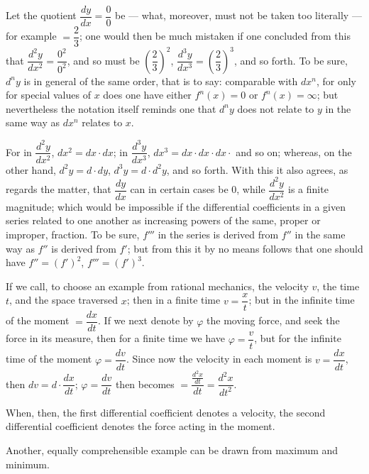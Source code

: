 \documentclass[12pt]{book}
\begin{document}
Let the quotient $\dfrac{dy}{dx} = \dfrac{0}{0}$ be --- what, moreover, must not be
taken too literally --- for example $= \dfrac{2}{3}$; one would then be much mistaken
if one concluded from this that $\dfrac{d^{2}y}{dx^{2}} = \dfrac{0^{2}}{0^{2}}$,
and so must be $\left(\dfrac{2}{3}\right)^{2}$,
$\dfrac{d^{3}y}{dx^{3}} = \left(\dfrac{2}{3}\right)^{3}$, and so forth. To be sure,
$d^{n}y$ is in general of the same order, that is to say: comparable with $dx^{n}$,
for only for special values of $x$ does one have either $f^{n}(x) = 0$ or
$f^{n}(x) = \infty$; but nevertheless the notation itself reminds one that $d^{n}y$
does not relate to $y$ in the same way as $dx^{n}$ relates to $x$.

For in $\dfrac{d^{2}y}{dx^{2}}$, $dx^{2} = dx\cdot dx$; in
$\dfrac{d^{3}y}{dx^{3}}$, $dx^{3} = dx\cdot dx\cdot dx\cdot$ and so on; whereas, on the
other hand, $d^{2}y = d\cdot dy$, $d^{3}y = d\cdot d^{2}y$, and so forth. With this it
also agrees, as regards the matter, that $\dfrac{dy}{dx}$ can in certain cases be 0,
while $\dfrac{d^{2}y}{dx^{2}}$ is a finite magnitude; which would be impossible if the
differential coefficients in a given series related to one another as increasing
powers of the same, proper or improper, fraction. To be sure, $f'''$ in the series is
derived from $f''$ in the same way as $f''$ is derived from $f'$; but from this it by
no means follows that one should have $f'' = (f')^{2}$, $f''' = (f')^{3}$.

If we call, to choose an example from rational mechanics, the velocity $v$, the time
$t$, and the space traversed $x$; then in a finite time $v = \dfrac{x}{t}$; but in
the infinite time of the moment $= \dfrac{dx}{dt}$. If we next denote by $\varphi$
the moving force, and seek the force in its measure, then for a finite time we have
$\varphi = \dfrac{v}{t}$, but for the infinite time of the moment
$\varphi = \dfrac{dv}{dt}$. Since now the velocity in each moment is
$v = \dfrac{dx}{dt}$, then $dv = d\cdot\dfrac{dx}{dt}$; $\varphi = \dfrac{dv}{dt}$
then becomes $= \dfrac{\frac{d^{2}x}{dt}}{dt} = \dfrac{d^{2}x}{dt^{2}}$.

When, then, the first differential coefficient denotes a velocity, the second
differential coefficient denotes the force acting in the moment.

Another, equally comprehensible example can be drawn from maximum and minimum.
\end{document}
